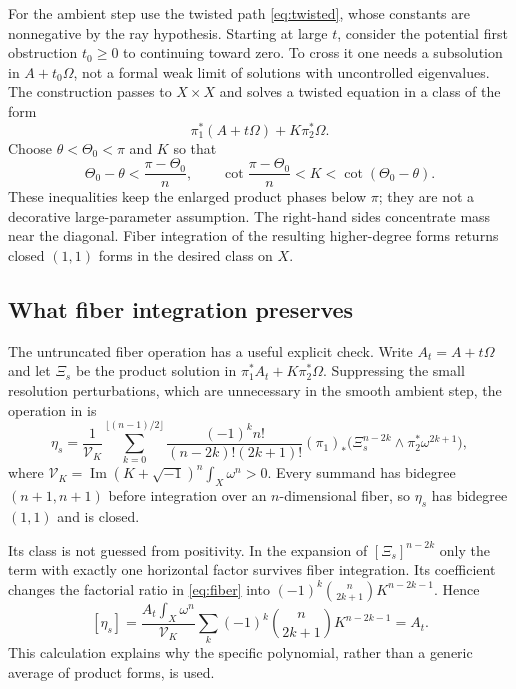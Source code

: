 \documentclass[12pt,reqno]{amsart}
\newcommand{\ii}{\sqrt{-1}}
\newcommand{\Imm}{\operatorname{Im}}
\begin{document}
For the ambient step use the twisted path \eqref{eq:twisted}, whose constants are nonnegative by the ray hypothesis. Starting at large $t$, consider the potential first obstruction $t_0\geq0$ to continuing toward zero. To cross it one needs a subsolution in $A+t_0\Omega$, not a formal weak limit of solutions with uncontrolled eigenvalues. The construction passes to $X\times X$ and solves a twisted equation in a class of the form
\[
 \pi_1^*(A+t\Omega)+K\pi_2^*\Omega.
\]
Choose $\theta<\Theta_0<\pi$ and $K$ so that
\[
 \Theta_0-\theta<\frac{\pi-\Theta_0}{n},\qquad
 \cot\frac{\pi-\Theta_0}{n}<K<\cot(\Theta_0-\theta).
\]
These inequalities keep the enlarged product phases below $\pi$; they are not a decorative large-parameter assumption. The right-hand sides concentrate mass near the diagonal. Fiber integration of the resulting higher-degree forms returns closed $(1,1)$ forms in the desired class on $X$.

\subsection{What fiber integration preserves}
The untruncated fiber operation has a useful explicit check. Write $A_t=A+t\Omega$ and let $\Xi_s$ be the product solution in $\pi_1^*A_t+K\pi_2^*\Omega$. Suppressing the small resolution perturbations, which are unnecessary in the smooth ambient step, the operation in \cite[Section 5]{CLT} is
\begin{equation}\label{eq:fiber}
 \eta_s=\frac1{\mathcal V_K}
 \sum_{k=0}^{\lfloor(n-1)/2\rfloor}
 \frac{(-1)^k n!}{(n-2k)!(2k+1)!}
 (\pi_1)_*\bigl(\Xi_s^{n-2k}\wedge\pi_2^*\omega^{2k+1}\bigr),
\end{equation}
where $\mathcal V_K=\Imm(K+\ii)^n\int_X\omega^n>0$. Every summand has bidegree $(n+1,n+1)$ before integration over an $n$-dimensional fiber, so $\eta_s$ has bidegree $(1,1)$ and is closed.

Its class is not guessed from positivity. In the expansion of $[\Xi_s]^{n-2k}$ only the term with exactly one horizontal factor survives fiber integration. Its coefficient changes the factorial ratio in \eqref{eq:fiber} into $(-1)^k\binom n{2k+1}K^{n-2k-1}$. Hence
\[
 [\eta_s]=\frac{A_t\int_X\omega^n}{\mathcal V_K}
  \sum_k(-1)^k\binom n{2k+1}K^{n-2k-1}=A_t.
\]
This calculation explains why the specific polynomial, rather than a generic average of product forms, is used.
\end{document}
